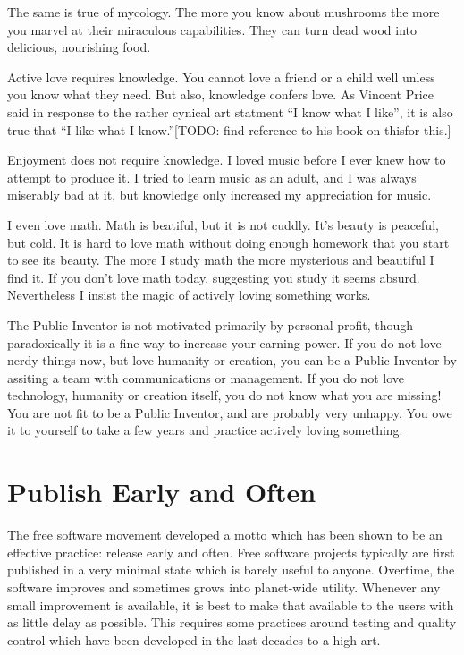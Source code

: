 \documentclass[
	fontsize=10pt, %
	twoside=false, %
	secnumdepth=1, %
]{kaobook}
\begin{document}
The same is true of mycology. The more you know about mushrooms
the more you marvel at their miraculous capabilities.
They can turn dead wood into delicious, nourishing food.

Active love requires knowledge. You cannot love a friend or a child
well unless you know what they need. But also, knowledge
confers love. As Vincent Price said in response to the
rather cynical art statment ``I know what I like'', it is
also true that ``I like what I know.''[TODO: find reference to his book on thisfor this.]

Enjoyment does not require knowledge. I loved music before
I ever knew how to attempt to produce it. I tried to learn music as an adult,
and I was always miserably bad at it, but knowledge only increased my appreciation for music.

I even love math. Math is beatiful, but it is not cuddly. It's beauty is peaceful, but cold.
It is hard to love math without doing enough homework that you start to see its beauty.
The more I study math the more mysterious and beautiful I find it.
If you don't love math today, suggesting you study it seems absurd.
Nevertheless I insist the magic of actively loving something works.

The Public Inventor is not motivated primarily by personal profit,
though paradoxically it is a fine way to increase your earning power.
If you do not love nerdy things now, but love humanity or creation, you can
be a Public Inventor by assiting a team with communications or management.
If you do not love technology, humanity or creation itself,
you do not know what you are missing!
You are not fit to be a Public Inventor, and
are probably very unhappy.
You owe it to yourself to take a few years and practice actively loving something.

\section{Publish Early and Often}

The free software movement developed a motto which has been shown to be an
effective practice: release early and often.
Free software projects typically are first published in a very minimal state
which is barely useful to anyone.
Overtime, the software improves and sometimes grows into planet-wide utility.
Whenever any small improvement is available, it is best to make that
available to the users with as little delay as possible.
This requires some practices around testing and quality control which have
been developed in the last decades to a high art.
\end{document}
